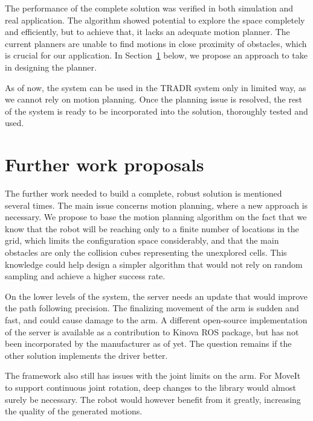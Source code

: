 \documentclass[buriama8_dp.tex]{subfiles}
\begin{document}
The performance of the complete solution was verified in both simulation and real application. The algorithm showed potential to explore the space completely and efficiently, but to achieve that, it lacks an adequate motion planner. The current planners are unable to find motions in close proximity of obstacles, which is crucial for our application. In Section~\ref{sec:propose} below, we propose an approach to take in designing the planner.

As of now, the system can be used in the TRADR system only in limited way, as we cannot rely on motion planning. Once the planning issue is resolved, the rest of the system is ready to be incorporated into the solution, thoroughly tested and used.

\section{Further work proposals}
\label{sec:propose}

The further work needed to build a complete, robust solution is mentioned several times. The main issue concerns motion planning, where a new approach is necessary. We propose to base the motion planning algorithm on the fact that we know that the robot will be reaching only to a finite number of locations in the grid, which limits the configuration space considerably, and that the main obstacles are only the collision cubes representing the unexplored cells. This knowledge could help design a simpler algorithm that would not rely on random sampling and achieve a higher success rate.

On the lower levels of the system, the  server needs an update that would improve the path following precision. The finalizing movement of the arm is sudden and fast, and could cause damage to the arm. A different open-source implementation of the server is available as a contribution to Kinova ROS package, but has not been incorporated by the manufacturer as of yet. The question remains if the other solution implements the driver better.

The framework also still has issues with the joint limits on the arm. For MoveIt to support continuous joint rotation, deep changes to the library would almost surely be necessary. The robot would however benefit from it greatly, increasing the quality of the generated motions.
\end{document}
